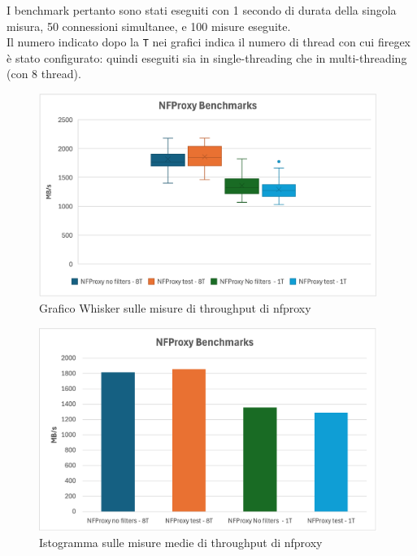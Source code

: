 I benchmark pertanto sono stati eseguiti con 1 secondo di durata della singola misura, 50 connessioni simultanee, e 100 misure eseguite.\\
Il numero indicato dopo la \texttt{T} nei grafici indica il numero di thread con cui firegex è stato configurato: quindi eseguiti sia in single-threading che in multi-threading (con 8 thread).\\

\begin{figure}[H]
    \centering
    \includegraphics[width=0.98\textwidth]{images/chapter4/whisker_nfproxy.png}
    \caption{Grafico Whisker sulle misure di throughput di nfproxy}\label{fig:wisker_nfproxy}
\end{figure}

\begin{figure}[H]
    \centering
    \includegraphics[width=0.98\textwidth]{images/chapter4/istogramma_nfproxy.png}
    \caption{Istogramma sulle misure medie di throughput di nfproxy}\label{fig:istogramma_nfproxy}
\end{figure}


